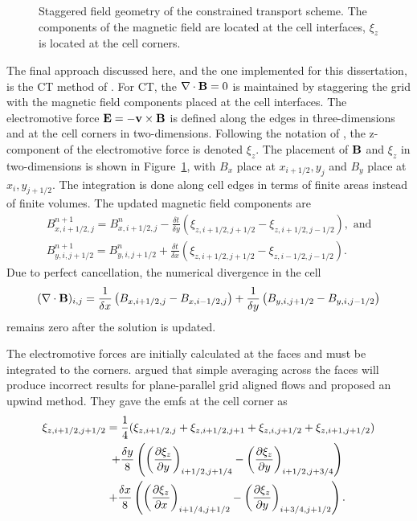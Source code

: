 \begin{figure}[htbp]\figSpace
\begin{center}

\end{center}
\caption{Staggered field geometry of the constrained transport scheme.  The components of the magnetic field are located at the cell interfaces, $\xi_z$ is located at the cell corners.}
\label{fig:ct_grid}
\figSpace
\end{figure}

The final approach discussed here, and the one implemented for this dissertation, is the CT method of \citet{Evans:1988}.  For CT, the $\mathbf{\nabla} \cdot \mathbf{B} = 0$ is maintained by staggering the grid with the magnetic field components placed at the cell interfaces.  The electromotive force $\mathbf{E} = -\mathbf{v} \times \mathbf{B}$ is defined along the edges in three-dimensions and at the cell corners in two-dimensions.  Following the notation of \citep{Stone:2008}, the z-component of the electromotive force is denoted $\xi_z$.  The placement of $\mathbf{B}$ and $\xi_z$ in two-dimensions is shown in Figure~\ref{fig:ct_grid}, with $B_x$ place at $x_{i+1/2}, y_j$ and $B_y$ place at $x_i,y_{j+1/2}$.  The integration is done along cell edges in terms of finite areas instead of finite volumes.  The updated magnetic field components are
\begin{gather}
B^{n+1}_{x,i+1/2,j} = B^{n}_{x,i+1/2,j} - \frac{\delta t}{\delta y}\left( \xi_{z,i+1/2,j+1/2} - \xi_{z,i+1/2,j-1/2}\right), \text{ and} \\
B^{n+1}_{y,i,j+1/2} = B^{n}_{y,i,j+1/2} + \frac{\delta t}{\delta x}\left( \xi_{z,i+1/2,j+1/2} - \xi_{z,i-1/2,j-1/2}\right).
\end{gather}
Due to perfect cancellation, the numerical divergence in the cell 
\begin{gather}
(\mathbf{\nabla} \cdot \mathbf{B})_{i,j} = \frac{1}{\delta x} \left( B_{x,i+1/2,j}  - B_{x,i-1/2,j}\right) + \frac{1}{\delta y} \left( B_{y,i,j+1/2}  - B_{y,i,j-1/2}\right) 
\end{gather}
remains zero after the solution is updated.

The electromotive forces are initially calculated at the faces and must be integrated to the corners.  \citet{Gardiner:2005} argued that simple averaging across the faces will produce incorrect results for plane-parallel grid aligned flows and proposed an upwind method.  They gave the emfs at the cell corner as 
\begin{gather}
\xi_{z,i+1/2,j+1/2} = \frac{1}{4}(\xi_{z,i+1/2,j} + \xi_{z,i+1/2,j+1} + \xi_{z,i,j+1/2} + \xi_{z,i+1,j+1/2}) \\
\;\;\;\;\;\;\;\;\;\;\;\;  +  \frac{\delta y}{8} \left( \left(\frac{\partial \xi_z}{\partial y}\right)_{i+1/2,j+1/4} - \left(\frac{\partial \xi_z}{\partial y}\right)_{i+1/2,j+3/4} \right) \\
\;\;\;\;\;\;\;\;\;\;\;\;  +  \frac{\delta x}{8} \left( \left(\frac{\partial \xi_z}{\partial x}\right)_{i+1/4,j+1/2} - \left(\frac{\partial \xi_z}{\partial y}\right)_{i+3/4,j+1/2} \right) .
\end{gather}  

